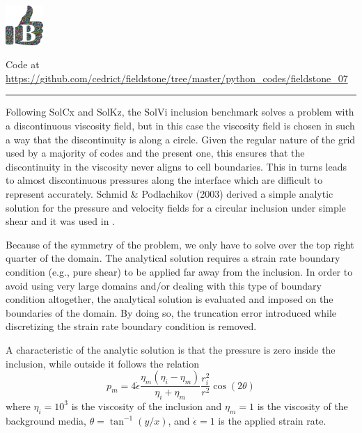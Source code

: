 
\includegraphics[height=1.5cm]{images/pictograms/benchmark}



\begin{center}
Code at \url{https://github.com/cedrict/fieldstone/tree/master/python_codes/fieldstone_07}
\end{center}

\par\noindent\rule{\textwidth}{0.4pt}

Following SolCx and SolKz, the SolVi inclusion benchmark solves 
a problem with a discontinuous viscosity field, but in this case 
the viscosity field is chosen in such a way that the discontinuity 
is along a circle. Given the regular nature of the grid used by a majority of codes and the present one, 
this ensures that the discontinuity in the viscosity never aligns to cell boundaries.
This in turns leads to almost discontinuous pressures along the interface which are difficult to represent accurately.
Schmid \& Podlachikov (2003) \cite{scpo03} derived a simple analytic solution for the pressure and 
velocity fields for a circular 
inclusion under simple shear and it was used in \cite{deka08,sunh10,dumg11,krhb12,gemd13}.

Because of the symmetry of the problem, we only have to solve over the top right quarter of the domain.
The analytical solution requires a strain rate boundary condition (e.g., pure shear) to be applied far away 
from the inclusion. In order to avoid using very large domains and/or dealing with this type of boundary condition 
altogether, the analytical solution is evaluated and imposed on the boundaries of the domain. 
By doing so, the truncation error introduced while discretizing the strain rate boundary condition is removed.

A characteristic of the analytic solution is that the pressure is zero inside the inclusion, while outside it follows the relation
\begin{equation}
p_m = 4 \dot{\epsilon}
\frac{\eta_m(\eta_i-\eta_m)}{\eta_i+\eta_m}
\frac{r_i^2}{r^2} \cos(2\theta)
\end{equation}
where $\eta_i = 10^3$ is the viscosity of the inclusion 
and $\eta_m = 1$ is the viscosity of the background media, $\theta=\tan^{-1}(y/x)$,
and $\dot{\epsilon}=1$ is the applied strain rate.

